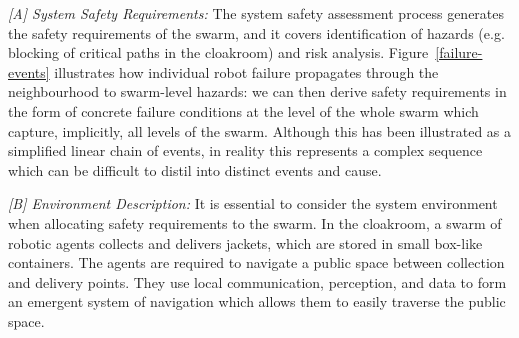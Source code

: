 \documentclass[runningheads]{llncs}
\begin{document}
\emph{[A] System Safety Requirements:}
The system safety assessment process generates the safety requirements of the swarm, and it covers identification of hazards (e.g. blocking of critical paths in the cloakroom) and risk analysis.
Figure~\ref{failure-events} illustrates how individual robot failure propagates through the neighbourhood to swarm-level hazards: we can then derive safety requirements in the form of concrete failure conditions at the level of the whole swarm which capture, implicitly, all levels of the swarm. 
Although this has been illustrated as a simplified linear chain of events, in reality this represents a complex sequence which can be difficult to distil into distinct events and cause. 

\emph{[B] Environment Description:}
It is essential to consider the system environment when allocating safety requirements to the swarm. 
In the cloakroom, a swarm of robotic agents collects and delivers jackets, which are stored in small box-like containers. 
The agents are required to navigate a public space between collection and delivery points. They use local communication, perception, and data to form an emergent system of navigation which allows them to easily traverse the public space. 
\end{document}
